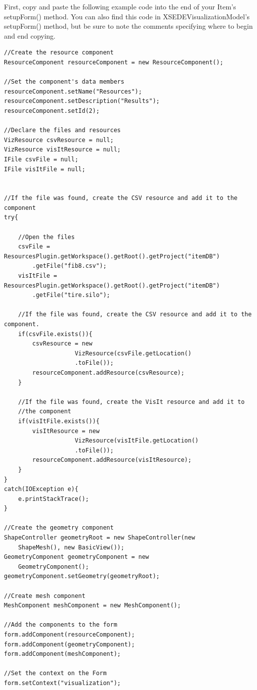 First, copy and paste the following example code into the end of your Item's
setupForm() method. You can also find this code in
XSEDEVisualizationModel's setupForm() method, but be sure to note the
comments specifying where to begin and end copying. 

\begin{verbatim}
//Create the resource component
ResourceComponent resourceComponent = new ResourceComponent();

//Set the component's data members
resourceComponent.setName("Resources");
resourceComponent.setDescription("Results");
resourceComponent.setId(2);

//Declare the files and resources
VizResource csvResource = null;
VizResource visItResource = null;
IFile csvFile = null;
IFile visItFile = null;


//If the file was found, create the CSV resource and add it to the component
try{
			
	//Open the files
	csvFile = ResourcesPlugin.getWorkspace().getRoot().getProject("itemDB")
		.getFile("fib8.csv");
	visItFile = ResourcesPlugin.getWorkspace().getRoot().getProject("itemDB")
		.getFile("tire.silo");
			
	//If the file was found, create the CSV resource and add it to the component.
	if(csvFile.exists()){
		csvResource = new 
                    VizResource(csvFile.getLocation()
                    .toFile());
    	resourceComponent.addResource(csvResource);
	}
				        
	//If the file was found, create the VisIt resource and add it to 
	//the component
	if(visItFile.exists()){
		visItResource = new 
                    VizResource(visItFile.getLocation()
                    .toFile());
		resourceComponent.addResource(visItResource);
	}
}
catch(IOException e){
	e.printStackTrace();
}

//Create the geometry component
ShapeController geometryRoot = new ShapeController(new
    ShapeMesh(), new BasicView());
GeometryComponent geometryComponent = new 
    GeometryComponent();
geometryComponent.setGeometry(geometryRoot);

//Create mesh component
MeshComponent meshComponent = new MeshComponent();

//Add the components to the form
form.addComponent(resourceComponent);
form.addComponent(geometryComponent);
form.addComponent(meshComponent);	
		
//Set the context on the Form
form.setContext("visualization");
\end{verbatim} 

